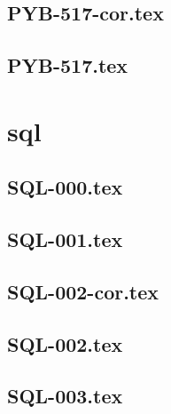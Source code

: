 \renewcommand{\xxexo}{PYB-517-cor.tex} 
\subsection*{\xxexo} 
\graphicspath{{../../exospython_bases/equadiffs/\xxexo/}}
 
 
\renewcommand{\xxexo}{PYB-517.tex} 
\subsection*{\xxexo} 
\graphicspath{{../../exospython_bases/equadiffs/\xxexo/}}
 
 
\section*{sql}
\renewcommand{\xxexo}{SQL-000.tex} 
\subsection*{\xxexo} 
\graphicspath{{../../exossql/equadiffs/\xxexo/}}
 
 
\renewcommand{\xxexo}{SQL-001.tex} 
\subsection*{\xxexo} 
\graphicspath{{../../exossql/equadiffs/\xxexo/}}
 
 
\renewcommand{\xxexo}{SQL-002-cor.tex} 
\subsection*{\xxexo} 
\graphicspath{{../../exossql/equadiffs/\xxexo/}}
 
 
\renewcommand{\xxexo}{SQL-002.tex} 
\subsection*{\xxexo} 
\graphicspath{{../../exossql/equadiffs/\xxexo/}}
 
 
\renewcommand{\xxexo}{SQL-003.tex} 
\subsection*{\xxexo} 
\graphicspath{{../../exossql/equadiffs/\xxexo/}}
 
 
